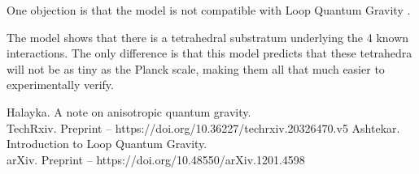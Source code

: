\documentclass[12pt]{article}
\begin{document}
One objection is that the model is not compatible with Loop Quantum Gravity \cite{ashtekar}.

The model shows that there is a tetrahedral substratum underlying the 4 known interactions.
The only difference is that this model predicts that these tetrahedra will not be as tiny as the Planck scale, making them all that much easier to experimentally verify.







\begin{thebibliography}{9}

 Halayka. A note on anisotropic quantum gravity.\\TechRxiv. Preprint -- https://doi.org/10.36227/techrxiv.20326470.v5
 Ashtekar. Introduction to Loop Quantum Gravity.\\arXiv. Preprint -- https://doi.org/10.48550/arXiv.1201.4598

\end{thebibliography}
\end{document}
